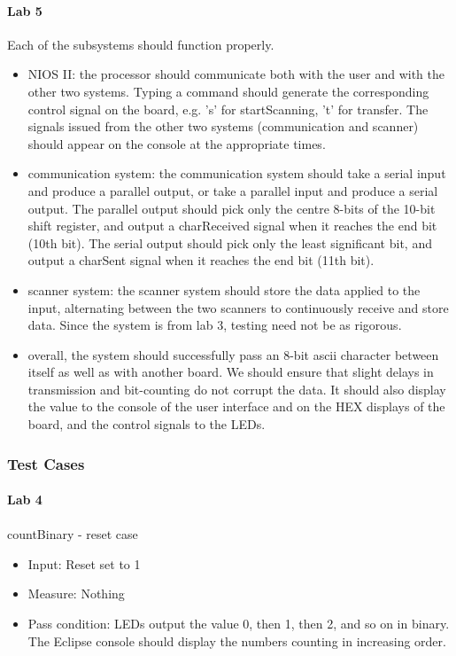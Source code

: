 \documentclass{article}
\begin{document}
    \paragraph{Lab 5} Each of the subsystems should function properly.
    \begin{itemize}
      \item NIOS II: the processor should communicate both with the user and with the other two systems. Typing a command should generate the corresponding control signal on the board, e.g. 's' for startScanning, 't' for transfer. The signals issued from the other two systems (communication and scanner) should appear on the console at the appropriate times.
      \item communication system: the communication system should take a serial input and produce a parallel output, or take a parallel input and produce a serial output. The parallel output should pick only the centre 8-bits of the 10-bit shift register, and output a charReceived signal when it reaches the end bit (10th bit). The serial output should pick only the least significant bit, and output a charSent signal when it reaches the end bit (11th bit).
      \item scanner system: the scanner system should store the data applied to the input, alternating between the two scanners to continuously receive and store data. Since the system is from lab 3, testing need not be as rigorous.
      \item overall, the system should successfully pass an 8-bit ascii character between itself as well as with another board. We should ensure that slight delays in transmission and bit-counting do not corrupt the data. It should also display the value to the console of the user interface and on the HEX displays of the board, and the control signals to the LEDs.
    \end{itemize}

    \subsubsection{Test Cases}
    \paragraph{Lab 4}
    \paragraph{} countBinary - reset case
    \begin{itemize}
      \item Input: Reset set to 1
      \item Measure: Nothing
      \item Pass condition: LEDs output the value 0, then 1, then 2, and so on in binary. The Eclipse console should display the numbers counting in increasing order. 
    \end{itemize}
\end{document}
